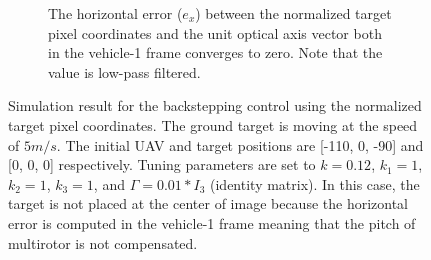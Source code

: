 \begin{figure}[htbp]
\begin{subfigure}[t]{0.8\linewidth}
		\caption{The horizontal error ($e_x$) between the normalized target pixel coordinates and the unit optical axis vector both in the vehicle-1 frame converges to zero. Note that the value is low-pass filtered.}
	\end{subfigure}	
	\caption{Simulation result for the backstepping control using the normalized target pixel coordinates. The ground target is moving at the speed of $5m/s$. The initial UAV and target positions are [-110, 0, -90] and [0, 0, 0] respectively. Tuning parameters are set to $k=0.12$, $k_1=1$, $k_2=1$, $k_3=1$, and $\Gamma=0.01*I_3$ (identity matrix). In this case, the target is not placed at the center of image because the horizontal error is computed in the vehicle-1 frame meaning that the pitch of multirotor is not compensated.}
	\label{image_5mps}
\end{figure}

